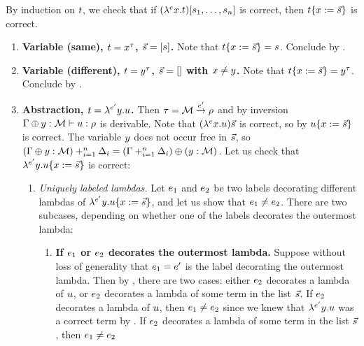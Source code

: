 \begin{enumerate}
    By induction on $t$, we check that
    if $(\lambda^{e} x. t)[s_1,\hdots,s_n]$
    is correct, then
    $t\{x := \vec{s}\}$ is correct.
    \begin{enumerate}
    \item {\bf Variable (same), $t = x^{\tau}$, $\vec{s} = [s]$.}
      Note that $t\{x := \vec{s}\} = s$. Conclude by .
    \item {\bf Variable (different), $t = y^{\tau}$, $\vec{s} = []$ with $x \neq y$.}
      Note that $t\{x := \vec{s}\} = y^\tau$.
      Conclude by .
    \item {\bf Abstraction, $t = \lambda^{e'} y. u$.}
      \label{subject_reduction__case_abstraction}
      Then $\tau = \mathcal{M} \overset{e'}{\to} \rho$ and
      by inversion $\Gamma \oplus y : \mathcal{M} \vdash u : \rho$ is derivable.
      Note that $(\lambda^{e} x. u)\vec{s}$ is correct,
      so by \ih $u\{x := \vec{s}\}$ is correct.
      The variable $y$ does not occur free in $\vec{s}$,
      so $(\Gamma \oplus y : \mathcal{M}) +_{i=1}^{n} \Delta_i = (\Gamma +_{i=1}^{n} \Delta_i) \oplus (y : \mathcal{M})$.
      Let us check that $\lambda^{e'} y. u\{x := \vec{s}\}$ is correct:
      \begin{enumerate}
      \item {\em Uniquely labeled lambdas.}
        Let $e_1$ and $e_2$ be two labels decorating different lambdas of 
        $\lambda^{e'} y. u\{x := \vec{s}\}$,
        and let us show that $e_1 \neq e_2$.
        There are two subcases, depending on whether one of the labels
        decorates the outermost lambda:
        \begin{enumerate}
        \item
          {\bf If $e_1$ or $e_2$ decorates the outermost lambda.}
          Suppose without loss of generality that $e_1 = e'$ is the label decorating the outermost lambda.
          Then by ,
          there are two cases: either $e_2$ decorates a lambda of $u$,
          or $e_2$ decorates a lambda of some term in the list $\vec{s}$.
          If $e_2$ decorates a lambda of $u$, then $e_1 \neq e_2$
          since we knew that $\lambda^{e'} y. u$ was a correct term by .
          If $e_2$ decorates a lambda of some term in the list $\vec{s}$, then $e_1 \neq e_2$

\end{enumerate}
\end{enumerate}
\end{enumerate}
\end{enumerate}
